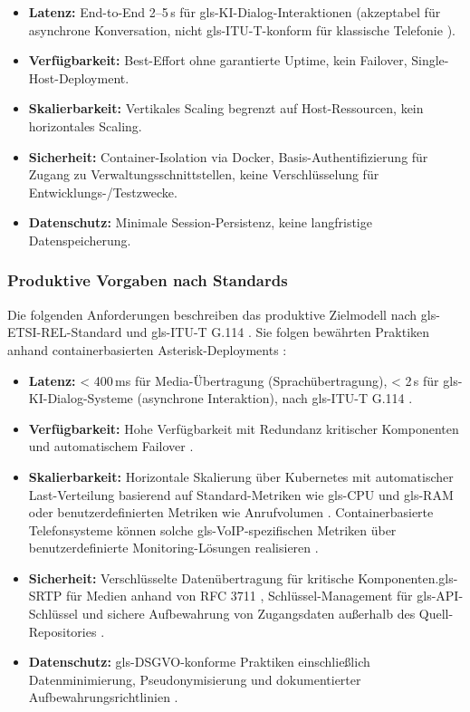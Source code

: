 \begin{itemize}
  \item \textbf{Latenz:} End-to-End 2--5\,s für \gls{gls-KI}-Dialog-Interaktionen (akzeptabel für asynchrone Konversation, nicht \gls{gls-ITU-T}-konform für klassische Telefonie \parencite{ITU-T-G114}).
  \item \textbf{Verfügbarkeit:} Best-Effort ohne garantierte Uptime, kein Failover, Single-Host-Deployment.
  \item \textbf{Skalierbarkeit:} Vertikales Scaling begrenzt auf Host-Ressourcen, kein horizontales Scaling.
  \item \textbf{Sicherheit:} Container-Isolation via Docker, Basis-Authentifizierung für Zugang zu Verwaltungsschnittstellen, keine Verschlüsselung für Entwicklungs-/Testzwecke.
  \item \textbf{Datenschutz:} Minimale Session-Persistenz, keine langfristige Datenspeicherung.
\end{itemize}

\subsubsection{Produktive Vorgaben nach Standards}

Die folgenden Anforderungen beschreiben das produktive Zielmodell nach \gls{gls-ETSI}-REL-Standard \parencite{ETSI-REL} und \gls{gls-ITU-T} G.114 \parencite{ITU-T-G114}. Sie folgen bewährten Praktiken anhand containerbasierten Asterisk-Deployments \parencite{Antonova2025}:

\begin{itemize}
  \item \textbf{Latenz:} < 400\,ms für Media-Übertragung (Sprachübertragung), < 2\,s für \gls{gls-KI}-Dialog-Systeme (asynchrone Interaktion), nach \gls{gls-ITU-T} G.114 \parencite{ITU-T-G114}.
  \item \textbf{Verfügbarkeit:} Hohe Verfügbarkeit mit Redundanz kritischer Komponenten und automatischem Failover \parencite{ETSI-REL}.
  \item \textbf{Skalierbarkeit:} Horizontale Skalierung über Kubernetes mit automatischer Last-Verteilung basierend auf Standard-Metriken wie \gls{gls-CPU} und \gls{gls-RAM} oder benutzerdefinierten Metriken wie Anrufvolumen \parencite{KubernetesDocs}. Containerbasierte Telefonsysteme können solche \gls{gls-VoIP}-spezifischen Metriken über benutzerdefinierte Monitoring-Lösungen realisieren \parencite{Antonova2025}.
  \item \textbf{Sicherheit:} Verschlüsselte Datenübertragung für kritische Komponenten.\gls{gls-SRTP} für Medien anhand von RFC 3711 \parencite{rfc3711}, Schlüssel-Management für \gls{gls-API}-Schlüssel und sichere Aufbewahrung von Zugangsdaten außerhalb des Quell-Repositories \parencite{Antonova2025}.
  \item \textbf{Datenschutz:} \gls{gls-DSGVO}-konforme Praktiken einschlie\ss lich Datenminimierung, Pseudonymisierung und dokumentierter Aufbewahrungsrichtlinien \parencite{Data2025_AIDataQuality}.
\end{itemize}


